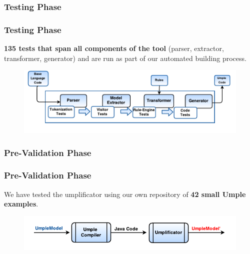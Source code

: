 \documentclass[xcolor=table]{beamer}
\begin{document}
\subsubsection{Testing Phase} 
\begin{frame}[fragile] 
\frametitle{Testing Phase}
\textbf{135 tests that span all components of the tool} (parser, extractor, transformer, generator) and are run as part of our automated building process.
\begin{figure}[h]
\centering
\includegraphics[width=1\textwidth]{Figures/testingPhase.pdf} 
\label{fig:testingPhase}
\end{figure}
\end{frame}

\subsubsection{Pre-Validation Phase} 
\begin{frame}[fragile] 
\frametitle{Pre-Validation Phase}
We have tested the umplificator using our own repository of \textbf{42 small Umple examples}.

\begin{figure}[h]
\centering
\includegraphics{Figures/preValidation.pdf} 
\label{fig:preValidation}
\end{figure}
\end{frame}
\end{document}
